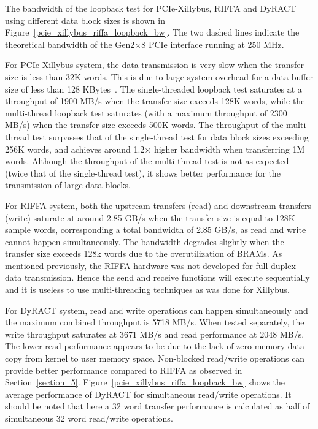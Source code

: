 The bandwidth of the loopback test for PCIe-Xillybus, RIFFA and DyRACT using different data block sizes is shown in Figure~\ref{pcie_xillybus_riffa_loopback_bw}. 
The two dashed lines indicate the theoretical bandwidth of the Gen2$\times$8 PCIe interface running at 250 MHz.



For PCIe-Xillybus system, the data transmission is very slow when the transfer size is less than 32K words. 
This is due to large system overhead for a data buffer size of less than 128 KBytes~\cite{xillybus2018}. 
The single-threaded loopback test saturates at a throughput of 1900 MB/s when the transfer size exceeds 128K words, while the multi-thread loopback test saturates (with a maximum throughput of 2300 MB/s) when the transfer size exceeds 500K words. 
The throughput of the multi-thread test surpasses that of the single-thread test for data block sizes exceeding 256K words, and achieves around 1.2$\times$ higher bandwidth when transferring 1M words. 
Although the throughput of the multi-thread test is not as expected (twice that of the single-thread test), it shows better performance for the transmission of large data blocks. 


For RIFFA system, both the upstream transfers (read) and downstream transfers (write) saturate at around 2.85 GB/s when the transfer size is equal to 128K sample words, corresponding a total bandwidth of 2.85 GB/s, as read and write cannot happen simultaneously. 
The bandwidth degrades slightly when the transfer size exceeds 128k words due to the overutilization of BRAMs.
As mentioned previously, the RIFFA hardware was not developed for full-duplex data transmission. 
Hence the send and receive functions will execute sequentially and it is useless to use multi-threading techniques as was done for Xillybus. 

For DyRACT system, read and write operations can happen simultaneously and the maximum combined throughput is 5718 MB/s. When tested separately, the write throughput saturates at 3671 MB/s and read performance at 2048 MB/s.
The lower read performance appears to be due to the lack of zero memory data copy from kernel to user memory space.
Non-blocked read/write operations can provide better performance compared to RIFFA as observed in Section~\ref{section_5}.
Figure~\ref{pcie_xillybus_riffa_loopback_bw} shows the average performance of DyRACT for simultaneous read/write operations.
It should be noted that here a 32 word transfer performance is calculated as half of simultaneous 32 word read/write operations.

